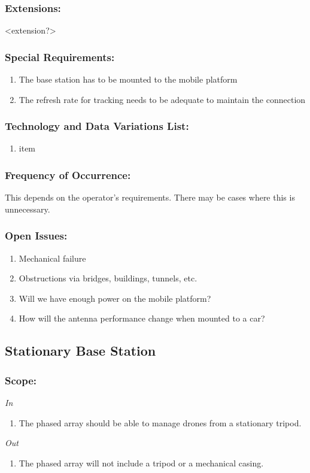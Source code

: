 \documentclass[ProductRequirements.tex]{subfiles}
\begin{document}
	\subsubsection*{Extensions:}
	<extension?>
	\subsubsection*{Special Requirements:}
	\begin{enumerate}\itemsep1pt
		\item The base station has to be mounted to the mobile platform
		\item The refresh rate for tracking needs to be adequate to maintain the connection
	\end{enumerate}
	\subsubsection*{Technology and Data Variations List:}
	\begin{enumerate}\itemsep1pt
		\item item
	\end{enumerate}
	\subsubsection*{Frequency of Occurrence:}
	This depends on the operator's requirements. There may be cases where this is unnecessary.
	\subsubsection*{Open Issues:}
	\begin{enumerate}\itemsep1pt
		\item Mechanical failure
		\item Obstructions via bridges, buildings, tunnels, etc.
		\item Will we have enough power on the mobile platform?
		\item How will the antenna performance change when mounted to a car?
	\end{enumerate}	
	
	\subsection{Stationary Base Station}
	\subsubsection*{Scope:}
	\textit{In}
	\begin{enumerate}
		\item The phased array should be able to manage drones from a stationary tripod.
	\end{enumerate}
	\textit{Out}
	\begin{enumerate}
		\item The phased array will not include a tripod or a mechanical casing.
	\end{enumerate}
\end{document}
